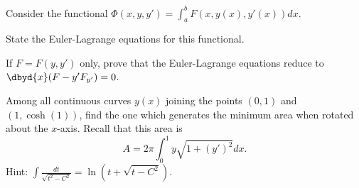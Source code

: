 Consider the functional $\Phi(x,y,y')=\int_{a}^{b}F(x,y(x),y'(x))dx$.
\begin{alist}
\item State the Euler-Lagrange equations for this functional.
\item If $F=F(y,y')$ only, prove that the Euler-Lagrange equations
reduce to $\dbyd{x}(F-y'F_{y'})=0$.
\item Among all continuous curves $y(x)$ joining the points $(0,1)$
and $(1,\cosh(1))$, find the one which generates the minimum area when
rotated about the $x$-axis. Recall that this area is
$$A=2\pi\int_{0}^1y\sqrt{1+(y')^2}dx.$$ Hint: $\int
\frac{dt}{\sqrt{t^2-C^2}}=\ln (t+\sqrt{t-C^2})$.
\end{alist}

